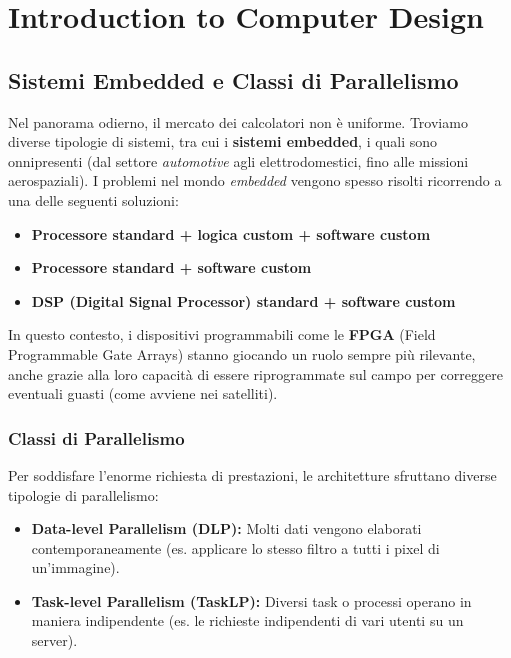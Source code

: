 \chapter{Introduction to Computer Design}

\section{Sistemi Embedded e Classi di Parallelismo}

Nel panorama odierno, il mercato dei calcolatori non è uniforme. Troviamo diverse tipologie di sistemi, tra cui i \textbf{sistemi embedded}, i quali sono onnipresenti (dal settore \textit{automotive} agli elettrodomestici, fino alle missioni aerospaziali).
I problemi nel mondo \textit{embedded} vengono spesso risolti ricorrendo a una delle seguenti soluzioni:
\begin{itemize}
    \item \textbf{Processore standard + logica custom + software custom}
    \item \textbf{Processore standard + software custom}
    \item \textbf{DSP (Digital Signal Processor) standard + software custom}
\end{itemize}
In questo contesto, i dispositivi programmabili come le \textbf{FPGA} (Field Programmable Gate Arrays) stanno giocando un ruolo sempre più rilevante, anche grazie alla loro capacità di essere riprogrammate sul campo per correggere eventuali guasti (come avviene nei satelliti).

\subsection{Classi di Parallelismo}
Per soddisfare l'enorme richiesta di prestazioni, le architetture sfruttano diverse tipologie di parallelismo:
\begin{itemize}
    \item \textbf{Data-level Parallelism (DLP):} Molti dati vengono elaborati contemporaneamente (es. applicare lo stesso filtro a tutti i pixel di un'immagine).
    \item \textbf{Task-level Parallelism (TaskLP):} Diversi task o processi operano in maniera indipendente (es. le richieste indipendenti di vari utenti su un server).
\end{itemize}


